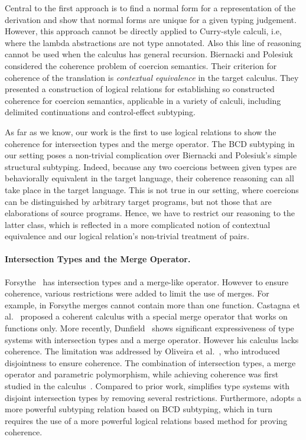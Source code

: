 Central to the first approach is to find a normal form for a representation of
the derivation and show that normal forms are unique for a given typing
judgement. However, this approach cannot be directly applied to Curry-style
calculi, i.e, where the lambda abstractions are not type annotated. Also this
line of reasoning cannot be used when the calculus has general recursion.
Biernacki and Polesiuk~\cite{biernacki2015logical} considered the coherence
problem of coercion semantics. Their criterion for coherence of the translation is
\textit{contextual equivalence} in the target calculus. They presented a construction of
logical relations for establishing so constructed coherence for coercion semantics,
applicable in a variety of calculi, including delimited continuations and
control-effect subtyping.

As far as we know, our work is the first to use logical relations
to show the coherence for intersection types and the merge operator. The BCD
subtyping in our setting poses a non-trivial complication over Biernacki and
Polesiuk's simple structural subtyping. Indeed, because any two coercions
between given types are behaviorally equivalent in the target language, their
coherence reasoning can all take place in the target language. This is not true
in our setting, where coercions can be distinguished by arbitrary target
programs, but not those that are elaborations of source programs. Hence, we have to
restrict our reasoning to the latter class, which is reflected in a more
complicated notion of contextual equivalence and our logical relation's
non-trivial treatment of pairs.

\paragraph{Intersection Types and the Merge Operator.}
Forsythe~\cite{reynolds1988preliminary} has intersection types and a merge-like operator. However to ensure coherence, various
restrictions were added to limit the use of merges. For example, in Forsythe
merges cannot contain more than one function. Castagna et al.~\cite{Castagna_1992} proposed a
coherent calculus with a special merge operator that works on functions only.
More recently, Dunfield~\cite{dunfield2014elaborating} shows significant expressiveness
of type systems with intersection types and a merge operator. However his
calculus lacks coherence. The limitation was addressed by
Oliveira et al.~\cite{oliveira2016disjoint}, who introduced disjointness to ensure
coherence. The combination of intersection types, a merge operator and
parametric polymorphism, while achieving coherence was first studied in the
\fname calculus~\cite{alpuimdisjoint}. Compared to prior work, \name simplifies type systems
with disjoint intersection types by removing several restrictions. 
Furthermore, \name adopts a more powerful subtyping relation based 
on BCD subtyping, which in turn requires the use of a more powerful
logical relations based method for proving coherence.



